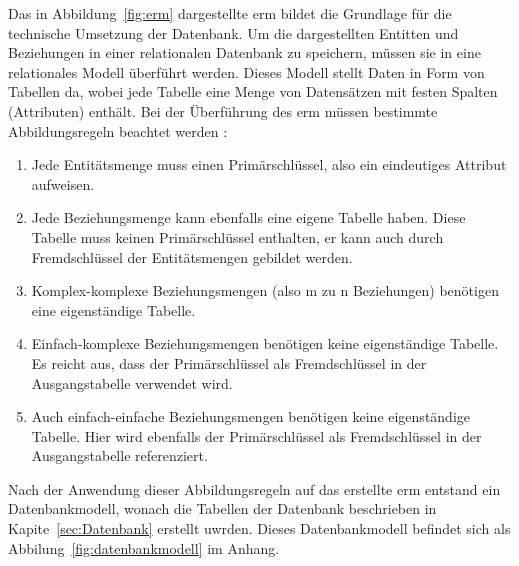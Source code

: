 Das in Abbildung~\ref{fig:erm} dargestellte \gls{erm} bildet die Grundlage für die technische Umsetzung der Datenbank. Um die dargestellten Entitten und Beziehungen in einer relationalen Datenbank zu speichern, müssen sie in eine relationales Modell überführt werden. Dieses Modell stellt Daten in Form von Tabellen da, wobei jede Tabelle eine Menge von Datensätzen mit festen Spalten (Attributen) enthält. Bei der Überführung des \gls{erm} müssen bestimmte Abbildungsregeln beachtet werden :
\begin{enumerate}
  \item Jede Entitätsmenge muss einen Primärschlüssel, also ein eindeutiges Attribut aufweisen.
  \item Jede Beziehungsmenge kann ebenfalls eine eigene Tabelle haben. Diese Tabelle muss keinen Primärschlüssel enthalten, er kann auch durch Fremdschlüssel der Entitätsmengen gebildet werden.
  \item Komplex-komplexe Beziehungsmengen (also m zu n Beziehungen) benötigen eine eigenständige Tabelle.
  \item Einfach-komplexe Beziehungsmengen benötigen keine eigenständige Tabelle. Es reicht aus, dass der Primärschlüssel als Fremdschlüssel in der Ausgangstabelle verwendet wird.
  \item Auch einfach-einfache Beziehungsmengen benötigen keine eigenständige Tabelle. Hier wird ebenfalls der Primärschlüssel als Fremdschlüssel in der Ausgangstabelle referenziert.
\end{enumerate}

Nach der Anwendung dieser Abbildungsregeln auf das erstellte \gls{erm} entstand ein Datenbankmodell, wonach die Tabellen der Datenbank beschrieben in Kapite~\ref{sec:Datenbank} erstellt uwrden. Dieses Datenbankmodell befindet sich als Abbilung~\ref{fig:datenbankmodell} im Anhang. 




